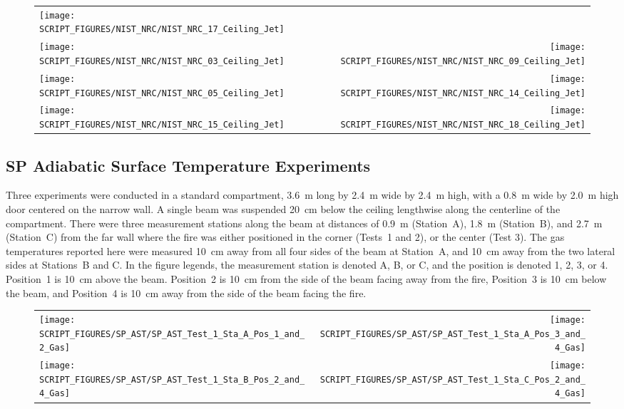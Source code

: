 \begin{figure}[p]
\begin{tabular*}{\textwidth}{l@{\extracolsep{\fill}}r}
\texttt{[image: SCRIPT\_FIGURES/NIST\_NRC/NIST\_NRC\_17\_Ceiling\_Jet]} &
 \\
\texttt{[image: SCRIPT\_FIGURES/NIST\_NRC/NIST\_NRC\_03\_Ceiling\_Jet]} &
\texttt{[image: SCRIPT\_FIGURES/NIST\_NRC/NIST\_NRC\_09\_Ceiling\_Jet]} \\
\texttt{[image: SCRIPT\_FIGURES/NIST\_NRC/NIST\_NRC\_05\_Ceiling\_Jet]} &
\texttt{[image: SCRIPT\_FIGURES/NIST\_NRC/NIST\_NRC\_14\_Ceiling\_Jet]} \\
\texttt{[image: SCRIPT\_FIGURES/NIST\_NRC/NIST\_NRC\_15\_Ceiling\_Jet]} &
\texttt{[image: SCRIPT\_FIGURES/NIST\_NRC/NIST\_NRC\_18\_Ceiling\_Jet]}
\end{tabular*}
\label{NIST_NRC_Jet_Open}
\end{figure}


\clearpage

\subsection{SP Adiabatic Surface Temperature Experiments}

Three experiments were conducted in a standard compartment, 3.6~m long by 2.4~m wide by 2.4~m high, with a 0.8~m wide by 2.0~m high door centered on the narrow wall. A single beam was suspended 20~cm below the ceiling lengthwise along the centerline of the compartment. There were three measurement stations along the beam at distances of 0.9~m (Station~A), 1.8~m (Station~B), and 2.7~m (Station~C) from the far wall where the fire was either positioned in the corner (Tests~1 and 2), or the center (Test 3). The gas temperatures reported here were measured 10~cm away from all four sides of the beam at Station~A, and 10~cm away from the two lateral sides at Stations~B and C. In the figure legends, the measurement station is denoted A, B, or C, and the position is denoted 1, 2, 3, or 4. Position~1 is 10~cm above the beam. Position~2 is 10~cm from the side of the beam facing away from the fire, Position~3 is 10~cm below the beam, and Position~4 is 10~cm away from the side of the beam facing the fire.

\begin{figure}[h!]
\begin{tabular*}{\textwidth}{l@{\extracolsep{\fill}}r}
\texttt{[image: SCRIPT\_FIGURES/SP\_AST/SP\_AST\_Test\_1\_Sta\_A\_Pos\_1\_and\_2\_Gas]} &
\texttt{[image: SCRIPT\_FIGURES/SP\_AST/SP\_AST\_Test\_1\_Sta\_A\_Pos\_3\_and\_4\_Gas]} \\
\texttt{[image: SCRIPT\_FIGURES/SP\_AST/SP\_AST\_Test\_1\_Sta\_B\_Pos\_2\_and\_4\_Gas]} &
\texttt{[image: SCRIPT\_FIGURES/SP\_AST/SP\_AST\_Test\_1\_Sta\_C\_Pos\_2\_and\_4\_Gas]}
\end{tabular*}
\label{SP_Test_1_Gas}
\end{figure}

